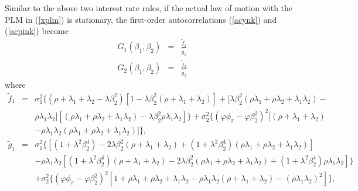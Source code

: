 Similar to the above two interest rate rules, if the actual law of motion with the PLM in (\ref{xplm}) is stationary, %
the first-order autocorrelations (\ref{acynk}) and (\ref{acpink})
become
\begin{eqnarray}
G_{1}(\beta_1,\beta_2) &=&\frac{\widetilde{f}_1}{\widetilde{g}_1}\label{acynklag}\\
G_{2}(\beta_1,\beta_2)
&=&\frac{\widetilde{f}_2}{\widetilde{g}_2}\label{acpinklag}
\end{eqnarray}
where
\begin{eqnarray*}
\widetilde{f}_1&=&\sigma_1^2\Big\{(\rho+\lambda_1+\lambda_2-\lambda\beta_2^2)[1-\lambda\beta_2^2(\rho+\lambda_1+\lambda_2)]+[\lambda\beta_2^2(\rho\lambda_1+\rho\lambda_2+\lambda_1\lambda_2)-\\
&&\rho\lambda_1\lambda_2][(\rho\lambda_1+\rho\lambda_2+\lambda_1\lambda_2)-\lambda\beta_2^2\rho\lambda_1\lambda_2]\Big\}+\sigma_2^2\Big\{(\varphi\phi_\pi-\varphi\beta_2^2)^2[(\rho+\lambda_1+\lambda_2)\\
&&-\rho\lambda_1\lambda_2(\rho\lambda_1+\rho\lambda_2+\lambda_1\lambda_2)]\Big\},\\
\widetilde{g}_1&=&\sigma_1^2\Big\{[(1+\lambda^2\beta_2^4)-2\lambda\beta_2^2(\rho+\lambda_1+\lambda_2)+(1+\lambda^2\beta_2^4)(\rho\lambda_1+\rho\lambda_2+\lambda_1\lambda_2)]\\
&&-\rho\lambda_1\lambda_2[(1+\lambda^2\beta_2^4)(\rho+\lambda_1+\lambda_2)-2\lambda\beta_2^2(\rho\lambda_1+\rho\lambda_2+\lambda_1\lambda_2)+(1+\lambda^2\beta_2^4)\rho\lambda_1\lambda_2]\Big\}\\
&&+\sigma_2^2\Big\{(\varphi\phi_\pi-\varphi\beta_2^2)^2[1+\rho\lambda_1+\rho\lambda_2+\lambda_1\lambda_2-\rho\lambda_1\lambda_2(\rho+\lambda_1+\lambda_2)-(\rho\lambda_1\lambda_2)^2]\Big\},\\
\end{eqnarray*}
